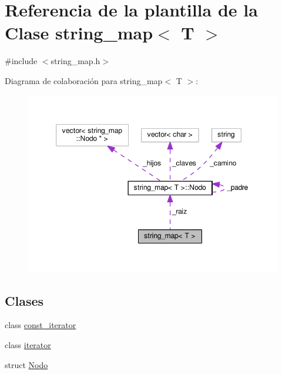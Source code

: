\hypertarget{classstring__map}{\section{Referencia de la plantilla de la Clase string\-\_\-map$<$ T $>$}
\label{classstring__map}
}


{\ttfamily \#include $<$string\-\_\-map.\-h$>$}



Diagrama de colaboración para string\-\_\-map$<$ T $>$\-:
\nopagebreak
\begin{figure}[H]
\begin{center}
\leavevmode
\includegraphics[width=349pt]{classstring__map__coll__graph}
\end{center}
\end{figure}
\subsection*{Clases}
\begin{DoxyCompactItemize}
\item 
class \hyperlink{classstring__map_1_1const__iterator}{const\-\_\-iterator}
\item 
class \hyperlink{classstring__map_1_1iterator}{iterator}
\item 
struct \hyperlink{structstring__map_1_1Nodo}{Nodo}
\end{DoxyCompactItemize}
